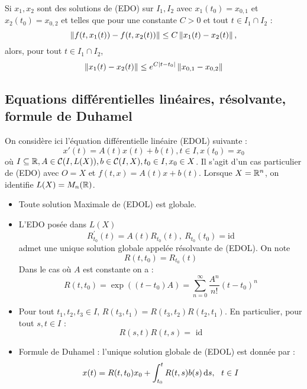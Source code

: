 \documentclass{cours}
\begin{document}
\begin{theorem}
    Si $x_{1}, x_{2}$ sont des solutions de (EDO) sur $I_{1}, I_{2}$ avec $x_{1}(t_{0}) = x_{0, 1}$ et $x_{2}(t_{0}) = x_{0, 2}$ et telles que pour une constante $C > 0$ et tout $t \in I_{1} \cap I_{2}$ :
    \[
        \left\lVert f(t, x_{1}(t)) - f(t, x_{2}(t)) \right\rVert \leq C\left\lVert x_{1}(t) - x_{2}(t) \right\rVert,
    \]
    alors, pour tout $t \in I_{1} \cap I_{2}$,
    \[
        \left\lVert x_{1}(t)-x_{2}(t) \right\rVert \leq e^{C\left|t - t_{0}\right|}\left\lVert x_{0, 1} - x_{0, 2} \right\rVert
    \]
\end{theorem}

\subsection{Equations différentielles linéaires, résolvante, formule de Duhamel}
On considère ici l'équation différentielle linéaire (EDOL) suivante :
\begin{equation*}
    x'(t) = A(t)x(t) + b(t), t \in I, x(t_{0}) = x_{0}
\end{equation*}
où $ I\subseteq \mathbb{R}, A \in \mathcal{C}(I, L(X)), b \in \mathcal{C}(I, X), t_{0} \in I, x_{0} \in X$. Il s'agit d'un cas particulier de (EDO) avec $O = X$ et $f(t, x) = A(t)x + b(t)$. Lorsque $X = \mathbb{R}^{n}$, on identifie $L(X) = M_{n}(\mathbb{R})$.

\begin{theorem}
    \begin{itemize}
        \item Toute solution Maximale de (EDOL) est globale.
        \item L'EDO posée dans $L(X)$
              \[
                  R_{t_{0}}^{'}(t) = A(t)R_{t_{0}}(t), \ R_{t_{0}}(t_{0}) = \text{id}
              \]
              admet une unique solution globale appelée résolvante de (EDOL). On note
              \[
                  R(t, t_{0}) = R_{t_{0}}(t)
              \]
              Dans le cas où $A$ est constante on a :
              \[
                  R(t, t_{0}) = \exp((t- t_{0})A) = \sum_{n= 0}^{\infty} \frac{A^{n}}{n!}(t- t_{0})^{n}
              \]
        \item Pour tout $t_{1}, t_{2}, t_{3} \in I$, $R(t_{3}, t_{1}) = R(t_{3}, t_{2})R(t_{2}, t_{1})$. En particulier, pour tout $s, t \in I$ :
              \[
                  R(s, t)R(t, s) = \text{ id}
              \]
        \item Formule de Duhamel : l'unique solution globale de (EDOL) est donnée par :
              \[
                  x(t) = R(t, t_{0})x_{0} + \int_{t_{0}}^{t}R(t, s)b(s){\rm \, d} s, \ \ t\in I
              \]
    \end{itemize}
\end{theorem}
\end{document}
